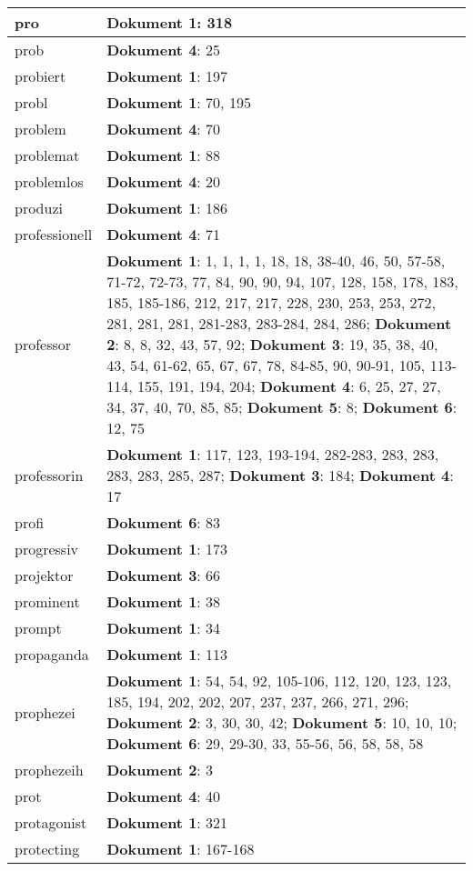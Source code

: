 \documentclass[a5paper]{article}
\begin{document}
\begin{longtable}[l]{|l|p{3in}|}
\hline
pro & \textbf{Dokument 1}: 318 \\
\hline
prob & \textbf{Dokument 4}: 25 \\
\hline
probiert & \textbf{Dokument 1}: 197 \\
\hline
probl & \textbf{Dokument 1}: 70, 195 \\
\hline
problem & \textbf{Dokument 4}: 70 \\
\hline
problemat & \textbf{Dokument 1}: 88 \\
\hline
problemlos & \textbf{Dokument 4}: 20 \\
\hline
produzi & \textbf{Dokument 1}: 186 \\
\hline
professionell & \textbf{Dokument 4}: 71 \\
\hline
professor & \textbf{Dokument 1}: 1, 1, 1, 1, 18, 18, 38-40, 46, 50, 57-58, 71-72, 72-73, 77, 84, 90, 90, 94, 107, 128, 158, 178, 183, 185, 185-186, 212, 217, 217, 228, 230, 253, 253, 272, 281, 281, 281, 281-283, 283-284, 284, 286; \textbf{Dokument 2}: 8, 8, 32, 43, 57, 92; \textbf{Dokument 3}: 19, 35, 38, 40, 43, 54, 61-62, 65, 67, 67, 78, 84-85, 90, 90-91, 105, 113-114, 155, 191, 194, 204; \textbf{Dokument 4}: 6, 25, 27, 27, 34, 37, 40, 70, 85, 85; \textbf{Dokument 5}: 8; \textbf{Dokument 6}: 12, 75 \\
\hline
professorin & \textbf{Dokument 1}: 117, 123, 193-194, 282-283, 283, 283, 283, 283, 285, 287; \textbf{Dokument 3}: 184; \textbf{Dokument 4}: 17 \\
\hline
profi & \textbf{Dokument 6}: 83 \\
\hline
progressiv & \textbf{Dokument 1}: 173 \\
\hline
projektor & \textbf{Dokument 3}: 66 \\
\hline
prominent & \textbf{Dokument 1}: 38 \\
\hline
prompt & \textbf{Dokument 1}: 34 \\
\hline
propaganda & \textbf{Dokument 1}: 113 \\
\hline
prophezei & \textbf{Dokument 1}: 54, 54, 92, 105-106, 112, 120, 123, 123, 185, 194, 202, 202, 207, 237, 237, 266, 271, 296; \textbf{Dokument 2}: 3, 30, 30, 42; \textbf{Dokument 5}: 10, 10, 10; \textbf{Dokument 6}: 29, 29-30, 33, 55-56, 56, 58, 58, 58 \\
\hline
prophezeih & \textbf{Dokument 2}: 3 \\
\hline
prot & \textbf{Dokument 4}: 40 \\
\hline
protagonist & \textbf{Dokument 1}: 321 \\
\hline
protecting & \textbf{Dokument 1}: 167-168 \\

\end{longtable}
\end{document}

